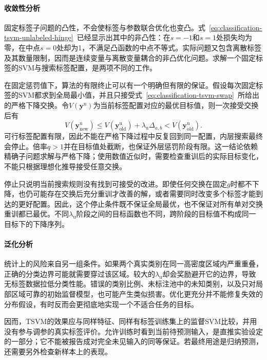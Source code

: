 \paragraph{收敛性分析}
固定标签子问题的凸性，不会使标签与参数联合优化也变凸。式~\eqref{eq:classification-tsvm-unlabeled-hinge}~已经显示出其中的非凸性：在$s=-1$和$s=1$处损失均为零，在中点$s=0$处却为1，不满足凸函数的中点不等式。实际问题又包含离散标签及其数量限制，因而是连续变量与离散变量耦合的非凸优化问题。求解一个固定标签的SVM与搜索标签配置，是两项不同的工作。

在固定惩罚值下，算法的有限终止可以有一个明确但有限的保证。假设每次固定标签的SVM都求到全局最小值，并且只接受式~\eqref{eq:classification-tsvm-swap}~所给出的严格下降交换。令$V(\bm{y}^{\mathrm{u}})$为当前标签配置对应的最优目标值，则一次接受交换后有
\[
  V(\bm{y}_{\mathrm{new}}^{\mathrm{u}})
    \leq V(\bm{y}_{\mathrm{old}}^{\mathrm{u}})
      +\lambda_{\mathrm{u}}\Delta_{a,b}
    <V(\bm{y}_{\mathrm{old}}^{\mathrm{u}}).
\]
可行标签配置有限，因此不能在严格下降过程中反复回到同一配置，内层搜索最终会停止。倍率$q>1$并在目标值处截断，也保证外层惩罚阶段有限。这一结论依赖精确子问题求解与严格下降；使用数值近似时，需要检查重训后的实际目标变化，不能只根据理想化推导接受任意交换。

停止只说明当前搜索规则没有找到可接受的改进。即使任何交换在固定$g$时都不下降，也仍可能存在交换后充分重训才改善的解，或者需要同时改变多个标签才能到达的更好配置。因此，这个停止条件既不保证全局最优，也不保证对所有单对交换重训都已最优。不同$\lambda_{\mathrm{u}}$阶段之间的目标函数也不同，跨阶段的目标值不构成同一目标下的下降序列。

\paragraph{泛化分析}
统计上的风险来自另一组条件。如果两个真实类别在同一高密度区域内严重重叠，正确的分类边界可能就需要穿过该区域。较大的$\lambda_{\mathrm{u}}$却会奖励避开它的边界，导致无标签数据拉低分类性能。错误的类别比例、未标注池中的未知类别，以及只对局部区域可靠的初始监督模型，也可能产生类似损害。优化更充分并不能修复失效的分布假设，有时反而会更彻底地实现一个不适合任务的目标。

因而，TSVM的效果应与同样特征、同样有标签训练集上的监督SVM比较，并用没有参与调参的真实标签评价。允许训练时看到当前待预测输入，是直推实验设定的一部分；它不能被报告成对完全未见输入的同等保证。若最终用途是归纳预测，还需要另外检查新样本上的表现。

